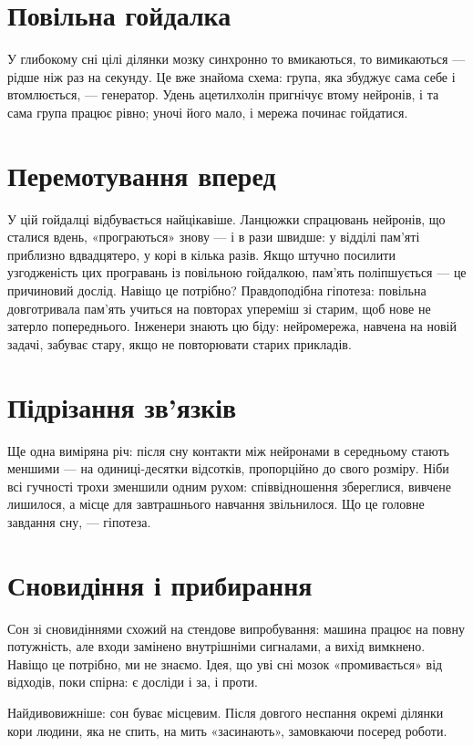 \section*{Повільна гойдалка}

У глибокому сні цілі ділянки мозку синхронно то вмикаються, то вимикаються --- рідше ніж раз на секунду. Це вже знайома схема: група, яка збуджує сама себе і втомлюється, --- генератор. Удень ацетилхолін пригнічує втому нейронів, і та сама група працює рівно; уночі його мало, і мережа починає гойдатися.


\section*{Перемотування вперед}

У цій гойдалці відбувається найцікавіше. Ланцюжки спрацювань нейронів, що сталися вдень, «програються» знову --- і в рази швидше: у відділі пам'яті приблизно вдвадцятеро, у корі в кілька разів. Якщо штучно посилити узгодженість цих програвань із повільною гойдалкою, пам'ять поліпшується --- це причиновий дослід. Навіщо це потрібно? Правдоподібна гіпотеза: повільна довготривала пам'ять учиться на повторах упереміш зі старим, щоб нове не затерло попереднього. Інженери знають цю біду: нейромережа, навчена на новій задачі, забуває стару, якщо не повторювати старих прикладів.

\section*{Підрізання зв'язків}

Ще одна виміряна річ: після сну контакти між нейронами в середньому стають меншими --- на одиниці-десятки відсотків, пропорційно до свого розміру. Ніби всі гучності трохи зменшили одним рухом: співвідношення збереглися, вивчене лишилося, а місце для завтрашнього навчання звільнилося. Що це головне завдання сну, --- гіпотеза.

\section*{Сновидіння і прибирання}

Сон зі сновидіннями схожий на стендове випробування: машина працює на повну потужність, але входи замінено внутрішніми сигналами, а вихід вимкнено. Навіщо це потрібно, ми не знаємо. Ідея, що уві сні мозок «промивається» від відходів, поки спірна: є досліди і за, і проти.

Найдивовижніше: сон буває місцевим. Після довгого неспання окремі ділянки кори людини, яка не спить, на мить «засинають», замовкаючи посеред роботи.

